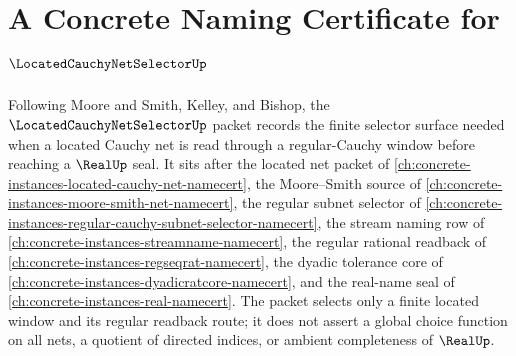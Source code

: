\chapter{A Concrete Naming Certificate for $\LocatedCauchyNetSelectorUp$}
\label{ch:concrete-instances-located-cauchy-net-selector-namecert}

Following Moore and Smith, Kelley, and Bishop, the $\LocatedCauchyNetSelectorUp$ packet records the finite selector surface needed when a located Cauchy net is read through a regular-Cauchy window before reaching a $\RealUp$ seal. It sits after the located net packet of \autoref{ch:concrete-instances-located-cauchy-net-namecert}, the Moore--Smith source of \autoref{ch:concrete-instances-moore-smith-net-namecert}, the regular subnet selector of \autoref{ch:concrete-instances-regular-cauchy-subnet-selector-namecert}, the stream naming row of \autoref{ch:concrete-instances-streamname-namecert}, the regular rational readback of \autoref{ch:concrete-instances-regseqrat-namecert}, the dyadic tolerance core of \autoref{ch:concrete-instances-dyadicratcore-namecert}, and the real-name seal of \autoref{ch:concrete-instances-real-namecert}. The packet selects only a finite located window and its regular readback route; it does not assert a global choice function on all nets, a quotient of directed indices, or ambient completeness of $\RealUp$.

